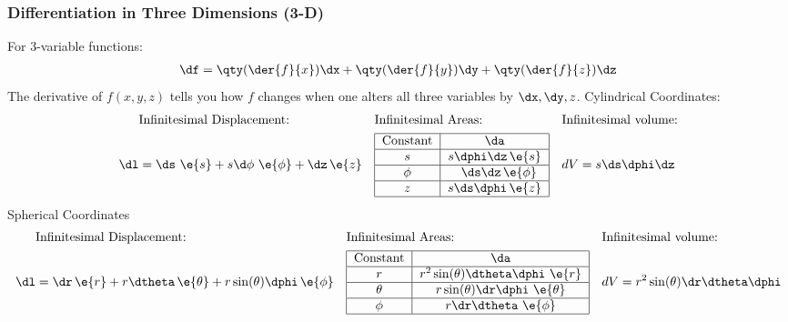     \subsubsection*{Differentiation in Three Dimensions (3-D)}
        For 3-variable functions:
        \begin{align*}
            \df =\qty(\der{f}{x})\dx + \qty(\der{f}{y})\dy + \qty(\der{f}{z})\dz
        \end{align*}
        The derivative of \(f(x,y,z)\) tells you how \(f\) changes when one alters all three variables by \(\dx, \dy, z\).
        Cylindrical Coordinates:
        \begin{align}
            &\text{Infinitesimal Displacement:}
            &&\text{Infinitesimal Areas:}
            &&\text{Infinitesimal volume:}\notag
            \\
            \dl&= \ds\ \e{s}+s\d\phi\ \e{\phi}+\dz\, \e{z} 
            &&
            \begin{tabular}{|c|c|}
                \hline
                Constant & \(\da\)\\
                \hline
                \(s\)    & \(s\dphi\dz\,\e{s}\)
                \\\hline
                \(\phi\) & \(~~\ds\dz\,\e{\phi}\)
                \\\hline
                \(z\)    & \(s\ds\dphi\,\e{z}\)
                \\
                \hline
            \end{tabular}
            &&
            dV=s\ds\dphi\dz
        \end{align}
        Spherical Coordinates
        \begin{align}
            &\text{Infinitesimal Displacement:}
            &&\text{Infinitesimal Areas:}
            &&\text{Infinitesimal volume:}
            \notag
            \\
            \dl &= \dr\,\e{r} + r \dtheta\, \e{\theta} + r \sin(\theta) \dphi\,\e{\phi}
            &&
            \begin{tabular}{|c|c|}
                \hline
                Constant & \(\da\) \\ 
                \hline
                \(r\)& \(r^2 \sin(\theta) \dtheta \dphi\ \e{r}\)\\ 
                \hline
                \(\theta\) & \(r \sin(\theta) \dr \dphi\ \e{\theta}\)\\
                \hline
                \(\phi\) & \(r \dr \dtheta\ \e{\phi}\)\\
                \hline
            \end{tabular}
            &&
            dV = r^2\sin(\theta) \dr \dtheta \dphi
        \end{align}
        \newpage
